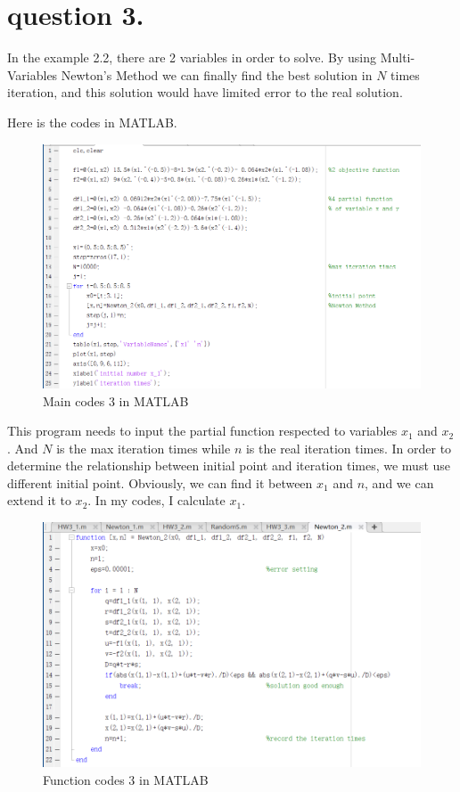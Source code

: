 \documentclass{report}
\begin{document}
\newpage
\section*{question 3.}
\par In the example 2.2, there are 2 variables in order to solve. 
By using Multi-Variables Newton's Method we can finally find the best solution 
in $N$ times iteration, and this solution would have limited error to the real solution. 

\par Here is the codes in MATLAB\@. 

\begin{figure}[htbp]
    \centering
    \includegraphics[scale=0.7]{figs/3_1.png}
    \caption{Main codes 3 in MATLAB}
\end{figure}

This program needs to input the partial function respected to variables $x_1$ and $x_2$. 
And $N$ is the max iteration times while $n$ is the real iteration times. 
In order to determine the relationship between initial point and iteration times, 
we must use different initial point. 
Obviously, we can find it between $x_1$ and $n$, and we can extend it to $x_2$. 
In my codes, I calculate $x_1$.

\newpage
\begin{figure}[htbp]
    \centering
    \includegraphics[scale=0.7]{figs/3_2.png}
    \caption{Function codes 3 in MATLAB}
\end{figure}
\end{document}
